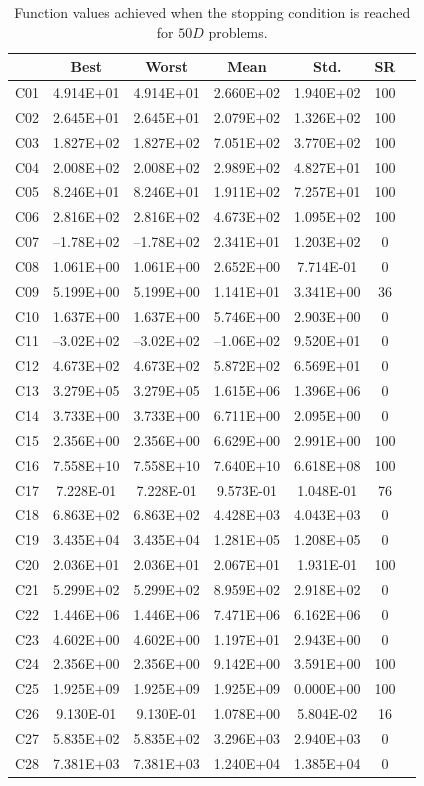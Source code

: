 \documentclass[conference]{IEEEtran}
\begin{document}
% 
% 
% 
\begin{table}[!ht]
	\caption{Function values achieved when the stopping condition is reached for $50D$ problems.}
	\centering
	\begin{tabular}{|c|c|c|c|c|c|c|}
	\hline
     & Best & Worst & Mean & Std. & SR \\ \hline \hline
C01 & 4.914E+01 & 4.914E+01 & 2.660E+02 & 1.940E+02 & 100 \\
C02 & 2.645E+01 & 2.645E+01 & 2.079E+02 & 1.326E+02 & 100 \\
C03 & 1.827E+02 & 1.827E+02 & 7.051E+02 & 3.770E+02 & 100 \\
C04 & 2.008E+02 & 2.008E+02 & 2.989E+02 & 4.827E+01 & 100 \\
C05 & 8.246E+01 & 8.246E+01 & 1.911E+02 & 7.257E+01 & 100 \\
C06 & 2.816E+02 & 2.816E+02 & 4.673E+02 & 1.095E+02 & 100 \\
C07 &--1.78E+02 &--1.78E+02 & 2.341E+01 & 1.203E+02 & 0 \\
C08 & 1.061E+00 & 1.061E+00 & 2.652E+00 & 7.714E-01 & 0 \\
C09 & 5.199E+00 & 5.199E+00 & 1.141E+01 & 3.341E+00 & 36 \\
C10 & 1.637E+00 & 1.637E+00 & 5.746E+00 & 2.903E+00 & 0 \\
C11 &--3.02E+02 &--3.02E+02 &--1.06E+02 & 9.520E+01 & 0 \\
C12 & 4.673E+02 & 4.673E+02 & 5.872E+02 & 6.569E+01 & 0 \\
C13 & 3.279E+05 & 3.279E+05 & 1.615E+06 & 1.396E+06 & 0 \\
C14 & 3.733E+00 & 3.733E+00 & 6.711E+00 & 2.095E+00 & 0 \\
C15 & 2.356E+00 & 2.356E+00 & 6.629E+00 & 2.991E+00 & 100 \\
C16 & 7.558E+10 & 7.558E+10 & 7.640E+10 & 6.618E+08 & 100 \\
C17 & 7.228E-01 & 7.228E-01 & 9.573E-01 & 1.048E-01 & 76 \\
C18 & 6.863E+02 & 6.863E+02 & 4.428E+03 & 4.043E+03 & 0 \\
C19 & 3.435E+04 & 3.435E+04 & 1.281E+05 & 1.208E+05 & 0 \\
C20 & 2.036E+01 & 2.036E+01 & 2.067E+01 & 1.931E-01 & 100 \\
C21 & 5.299E+02 & 5.299E+02 & 8.959E+02 & 2.918E+02 & 0 \\
C22 & 1.446E+06 & 1.446E+06 & 7.471E+06 & 6.162E+06 & 0 \\
C23 & 4.602E+00 & 4.602E+00 & 1.197E+01 & 2.943E+00 & 0 \\
C24 & 2.356E+00 & 2.356E+00 & 9.142E+00 & 3.591E+00 & 100 \\
C25 & 1.925E+09 & 1.925E+09 & 1.925E+09 & 0.000E+00 & 100 \\
C26 & 9.130E-01 & 9.130E-01 & 1.078E+00 & 5.804E-02 & 16 \\
C27 & 5.835E+02 & 5.835E+02 & 3.296E+03 & 2.940E+03 & 0 \\
C28 & 7.381E+03 & 7.381E+03 & 1.240E+04 & 1.385E+04 & 0 \\
\hline
	\end{tabular}
	\label{tab:d50}
\end{table}
\end{document}
